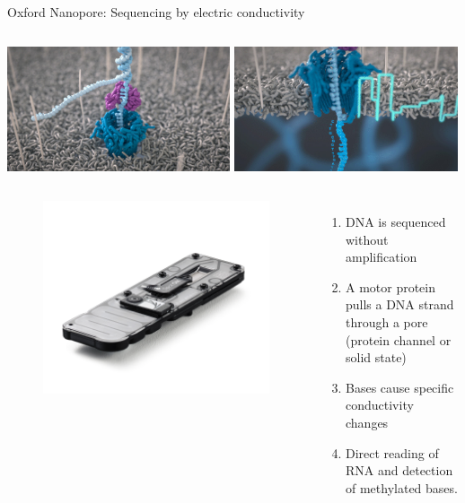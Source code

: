 \documentclass[10pt]{beamer}
\begin{document}
\begin{frame}{Oxford Nanopore: Sequencing by electric conductivity}
	\begin{columns}[T]
		\column{\dimexpr\paperwidth-10pt}
		\includegraphics[width=0.493\textwidth]{./figures/MinION_GIF_06.jpg}
		\includegraphics[width=0.493\textwidth]{./figures/MinION_GIF_08.jpg}
	\end{columns}
	\begin{columns}[T,onlytextwidth]
		\begin{figure}
			\includegraphics[width=\textwidth]{./figures/MinION Flow_Cell_transparent_3Qtr.png}
		\end{figure}
		\vspace{2em}
		\begin{enumerate}
			\item DNA is sequenced without amplification
			\item A motor protein pulls a DNA strand through a pore (protein channel or solid state)
			\item Bases cause specific conductivity changes
			\item Direct reading of RNA and detection of methylated bases. 
		\end{enumerate}
	\end{columns}
\end{frame}
\end{document}
